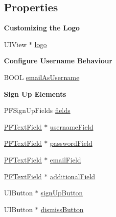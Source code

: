 \subsection*{Properties}
\begin{Indent}{\bf Customizing the Logo}\par
{\em 

 

 }\begin{DoxyCompactItemize}
\item 
U\+I\+View $\ast$ \hyperlink{interface_p_f_sign_up_view_ad3eb048df63f20896124028eb911016a}{logo}
\end{DoxyCompactItemize}
\end{Indent}
\begin{Indent}{\bf Configure Username Behaviour}\par
{\em 

 

 }\begin{DoxyCompactItemize}
\item 
B\+O\+O\+L \hyperlink{interface_p_f_sign_up_view_ad1e6db575f9bd76e4c952a4b9bf48347}{email\+As\+Username}
\end{DoxyCompactItemize}
\end{Indent}
\begin{Indent}{\bf Sign Up Elements}\par
{\em 

 

 }\begin{DoxyCompactItemize}
\item 
P\+F\+Sign\+Up\+Fields \hyperlink{interface_p_f_sign_up_view_a63e26333d686db43da83c0213c3e5229}{fields}
\item 
\hyperlink{interface_p_f_text_field}{P\+F\+Text\+Field} $\ast$ \hyperlink{interface_p_f_sign_up_view_a87cd8eb60bc9201825a00f98630736f3}{username\+Field}
\item 
\hyperlink{interface_p_f_text_field}{P\+F\+Text\+Field} $\ast$ \hyperlink{interface_p_f_sign_up_view_a626e890c1c1039321b71dc774fc080bc}{password\+Field}
\item 
\hyperlink{interface_p_f_text_field}{P\+F\+Text\+Field} $\ast$ \hyperlink{interface_p_f_sign_up_view_a4f01a403ba349386d546669a320b81fb}{email\+Field}
\item 
\hyperlink{interface_p_f_text_field}{P\+F\+Text\+Field} $\ast$ \hyperlink{interface_p_f_sign_up_view_ad99c2db623f95565e79418076b0bc111}{additional\+Field}
\item 
U\+I\+Button $\ast$ \hyperlink{interface_p_f_sign_up_view_ae319a64a63e1cc268b3a09263783b6f7}{sign\+Up\+Button}
\item 
U\+I\+Button $\ast$ \hyperlink{interface_p_f_sign_up_view_a3fce84d1b1027eb046a887f2efe3e156}{dismiss\+Button}
\end{DoxyCompactItemize}
\end{Indent}
